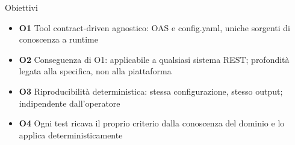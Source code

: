 
\begin{frame}{Obiettivi}
  \begin{itemize}
    \item \textbf{O1} \alert{Tool contract-driven agnostico}: OAS e config.yaml, uniche sorgenti di conoscenza a runtime

    \item \textbf{O2} Conseguenza di O1: applicabile a qualsiasi sistema REST; profondità legata alla \alert{specifica}, non alla \alert{piattaforma}

    \item \textbf{O3} \alert{Riproducibilità deterministica}: stessa configurazione, stesso output; indipendente dall'operatore

    \item \textbf{O4} Ogni test ricava il proprio criterio dalla \alert{conoscenza del dominio} e lo applica \alert{deterministicamente}
  \end{itemize}
\end{frame}
